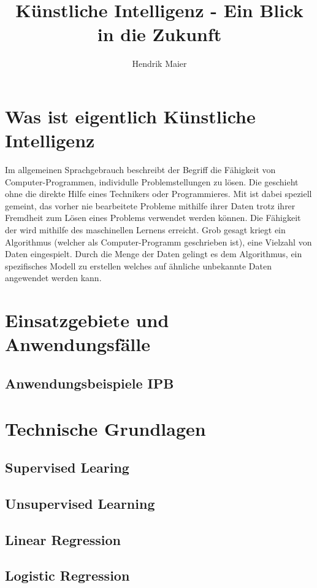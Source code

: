 \documentclass[12pt]{report}
\title{Künstliche Intelligenz - Ein Blick in die Zukunft}
\author{Hendrik Maier}
\date{}
\begin{document}
    \maketitle

    \tableofcontents
    \newpage

    \section{Was ist eigentlich Künstliche Intelligenz}
    Im allgemeinen Sprachgebrauch beschreibt der Begriff  die Fähigkeit von Computer-Programmen,
    individulle Problemstellungen zu lösen. Die geschieht ohne die direkte Hilfe eines Technikers oder Programmieres.
    Mit  ist dabei speziell gemeint, das vorher nie bearbeitete Probleme mithilfe ihrer Daten
    trotz ihrer Fremdheit zum Lösen eines Problems verwendet werden können. Die Fähigkeit der 
    wird mithilfe des maschinellen Lernens erreicht. Grob gesagt kriegt ein Algorithmus (welcher als Computer-Programm geschrieben ist),
    eine Vielzahl von Daten eingespielt. Durch die Menge der Daten gelingt es dem Algorithmus, ein spezifisches
    Modell zu erstellen welches auf ähnliche unbekannte Daten angewendet werden kann.


    \section{Einsatzgebiete und Anwendungsfälle}
    \subsection{Anwendungsbeispiele IPB}
    \section{Technische Grundlagen}
    \subsection{Supervised Learing}
    \subsection{Unsupervised Learning}
    \subsection{Linear Regression}
    \subsection{Logistic Regression}
\end{document}

